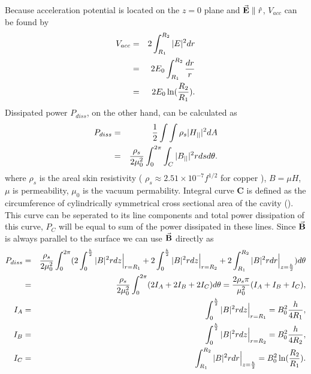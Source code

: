 \documentclass{article}
\begin{document}
Because acceleration potential is located on the $z=0$ plane and $\vec{\textbf{E}} \parallel \hat{r}$, $V_{acc}$ can be found by
\vspace{-10pt}\begin{eqnarray} 
    V_{acc} &=& 2 \int_{R_1}^{R_2} |E|^2 dr \nonumber\\
            &=& 2 E_0 \int_{R_1}^{R_2} \frac{dr}{r} \nonumber\\
            &=& 2 E_0 \ln(\frac{R_2}{R_1}). \label{eq:v_acc}
\vspace{-10pt}\end{eqnarray}
Dissipated power $P_{diss}$, on the other hand, can be calculated as \cite{rf}
\vspace{-10pt}\begin{eqnarray} 
    P_{diss} &=& \frac{1}{2} \int \int \rho_s | H_{||} |^2 dA \nonumber \\
             &=& \frac{\rho_s}{2\mu_0^2} \int_0^{2\pi} \int_C | B_{||} |^2 r ds d\theta . \label{eq:p_diss_C_curve}
\vspace{-10pt}\end{eqnarray}
where $\rho_s$ is the areal skin resistivity ( $\rho_s \approx 2.51 \times 10^{-7} f^{1/2}$ for copper \cite{rhodo_pottier} ), $B=\mu H$, $\mu$ is permeability, $\mu_0$ is the vacuum permability. 
Integral curve \textbf{C} is defined as the circumference of cylindrically symmetrical cross sectional area of the cavity ().
This curve can be seperated to its line components and total power dissipation of this curve, $P_C$ will be equal to sum of the power dissipated in these lines.
Since $\vec{\textbf{B}}$ is always parallel to the surface we can use $\vec{\textbf{B}}$ directly as
\vspace{-10pt}\begin{eqnarray}
    P_{diss} &=& \frac{\rho_s}{2\mu_0^2} \int_0^{2\pi} (
                   2\int_{0}^{\frac{h}{2}} |B|^2 r dz \Big|_{r=R_1}
                 + 2\int_{0}^{\frac{h}{2}} |B|^2 r dz \Big|_{r=R_2} 
                 + 2\int_{R_1}^{R_2} |B|^2 r dr \Big|_{z=\frac{h}{2}})d\theta \nonumber\\
             &=& \frac{\rho_s}{2\mu_0^2} \int_0^{2\pi} (2I_A + 2I_B + 2I_C)d\theta 
                 = \frac{2\rho_s \pi}{\mu_0^2}(I_A + I_B + I_C)   ,\\
    I_A &=& \int_{0}^{\frac{h}{2}} |B|^2 r dz \Big|_{r=R_1} = B_0^2 \frac{h}{4R_1}   ,\\
    I_B &=& \int_{0}^{\frac{h}{2}} |B|^2 r dz \Big|_{r=R_2} = B_0^2 \frac{h}{4R_2}   ,\\
    I_C &=& \int_{R_1}^{R_2} |B|^2 r dr \Big|_{z=\frac{h}{2}} = B_0^2 \ln(\frac{R_2}{R_1}) .
\vspace{-10pt}\end{eqnarray}
\end{document}
